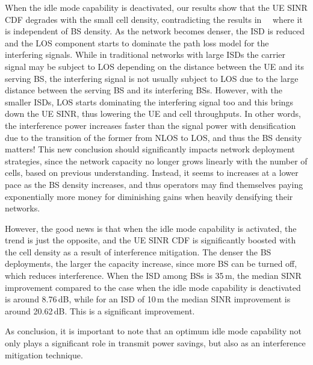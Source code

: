 \documentclass{IEEEtran}
\begin{document}
When the idle mode capability is deactivated,
our results show that the \ac{UE} \ac{SINR} \ac{CDF} degrades with the small cell density,
contradicting the results in~\cite{Andrews2011}~\cite{Mukherjee2012} where it is independent of \ac{BS} density.
As the network becomes denser,
the \ac{ISD} is reduced and the \ac{LOS} component starts to dominate the path loss model for the interfering signals.
While in traditional networks with large \acp{ISD} the carrier signal may be subject to \ac{LOS} depending on the distance between the \ac{UE} and its serving \ac{BS},
the interfering signal is not usually subject to \ac{LOS} due to the large distance between the serving \ac{BS} and its interfering \acp{BS}.
However, with the smaller \acp{ISD},
\ac{LOS} starts dominating the interfering signal too and this brings down the \ac{UE} \ac{SINR},
thus lowering the \ac{UE} and cell throughputs.
In other words, the interference power increases faster than the signal power with densification due to the transition of the former from \ac{NLOS} to \ac{LOS},
and thus the BS density matters!
This new conclusion should significantly impacts network deployment strategies,
since the network capacity no longer grows linearly with the number of cells, based on previous understanding.
Instead, it seems to increases at a lower pace as the BS density increases,
and thus operators may find themselves paying exponentially more money for diminishing gains when heavily densifying their networks.

However, the good news is that when the idle mode capability is activated,
the trend is just the opposite,
and the \ac{UE} \ac{SINR} \ac{CDF} is significantly boosted with the cell density as a result of interference mitigation.
The denser the \ac{BS} deployments, the larger the capacity increase,
since more \ac{BS} can be turned off,
which reduces interference.
When the \ac{ISD} among \acp{BS} is 35\,m,
the median \ac{SINR} improvement compared to the case when the idle mode capability is deactivated is around 8.76\,dB,
while for an \ac{ISD} of 10\,m
the median \ac{SINR} improvement is around 20.62\,dB.
This is a significant improvement.


As conclusion, it is important to note that an optimum idle mode capability not only plays a significant role in transmit power savings,
but also as an interference mitigation technique.

\begin{figure*}[t]
  \centering
  \caption{UE SINR CDF in ultra-dense small cell deployments with
  large \ac{BS} densities, 35, 20, 10 and 5\,m,
  low \ac{UE} densities, 100 and 600 active \acp{UE} per km$^2$
  and \ac{SNR} targets, 15,12 and 9.
   The rest of the parameters are $ud$=1, $s=1$, $f=2$\,GHz, and $a=1$.}
  \label{fig:transition}
\end{figure*}
\end{document}
